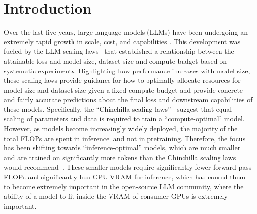 \documentclass{article}
\begin{document}
\section{Introduction}

Over the last five years, large language models (LLMs) have been undergoing an extremely rapid growth in scale, cost, and capabilities \citep{vaswani2017attention,radford2019language,brown2020language,team2023gemini,achiam2023gpt,sevilla2022compute}. 
This development was fueled by the LLM scaling laws~\citep{hestness2017deep,kaplan2020scaling,hoffmann2022training} that established a relationship between the attainable loss and model size, dataset size and compute budget based on systematic experiments. Highlighting how performance increases with model size, these scaling laws provide guidance for how to optimally allocate resources for model size and dataset size given a fixed compute budget and provide concrete and fairly accurate predictions about the final loss and downstream capabilities of these models. 
Specifically, the ``Chinchilla scaling laws''~\citep{hoffmann2022training} suggest that equal scaling of parameters and data is required to train a ``compute-optimal'' model. However, as models become increasingly widely deployed, the majority of the total FLOPs are spent in inference, and not in pretraining. Therefore, the focus has been shifting towards ``inference-optimal'' models, which are much smaller and are trained on significantly more tokens than the Chinchilla scaling laws would recommend~\citep{touvron2023llama,jiang2023mistral}. 
These smaller models require significantly fewer forward-pass FLOPs and significantly less GPU VRAM for inference, which has caused them to become extremely important in the open-source LLM community, where the ability of a model to fit inside the VRAM of consumer GPUs is extremely important.
\end{document}
